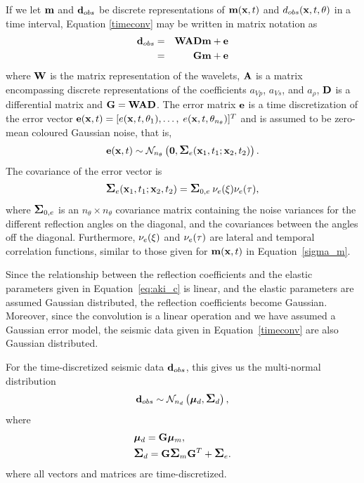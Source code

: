 If we let $\mathbf{m}$ and $\mathbf{d}_{obs}$ be discrete representations
of $\mathbf{m}(\mathbf{x},t)$ and $d_{obs}(\mathbf{x},t,\theta)$ in a time
interval, Equation \eqref{timeconv} may be written in matrix
notation as
%
\begin{eqnarray}
  \mathbf{d}_{obs} & = & \mathbf{W}\mathbf{A}\mathbf{D}\mathbf{m} + \mathbf{e} \label{eq:WADm}\\
                 & = & \mathbf{G}\mathbf{m} + \mathbf{e} \label{eq:Gm}
\end{eqnarray}
%
\noindent
where $\mathbf{W}$ is the matrix representation of the wavelets, $\mathbf{A}$ is
a matrix encompassing discrete representations of the coefficients $a_{Vp}$,
$a_{V\!s}$, and $a_\rho$, $\mathbf{D}$ is a differential matrix and
$\mathbf{G} = \mathbf{W}\mathbf{A}\mathbf{D}$. The
error matrix $\mathbf{e}$ is a time discretization of the error vector
$\mathbf{e}(\mathbf{x},t) = [e(\mathbf{x},t,\theta_1),\ldots,$
$e(\mathbf{x},t,\theta_{n_{\theta}})]^T$ and is assumed to be zero-mean
coloured Gaussian noise, that is,
%
\begin{equation}
  \mathbf{e}(\mathbf{x},t)
    \sim \mathcal{N}_{n_\theta}\left(\mathbf{0},
               \mbox{\large\ensuremath{\boldsymbol{\Sigma}}}_e(\mathbf{x}_1,t_1;\mathbf{x}_2,t_2)\right).
\label{edist}
\end{equation}
%
The covariance of the error vector is
%
\begin{equation}
  \mbox{\large\ensuremath{\boldsymbol{\Sigma}}}_e(\mathbf{x}_1,t_1;\mathbf{x}_2,t_2)
    = \mbox{\large\ensuremath{\boldsymbol{\Sigma}}}_{0,e} \: \nu_e(\xi) \nu_e(\tau), \label{sigma_e}
\end{equation}
%
where $\mbox{\large\ensuremath{\boldsymbol{\Sigma}}}_{0,e}$ is an $n_{\theta}\times n_{\theta}$
covariance matrix containing the noise variances for the different
reflection angles on the diagonal, and the covariances between the
angles off the diagonal. Furthermore, $\nu_e(\xi)$ and $\nu_e(\tau)$
are lateral and temporal correlation functions, similar to those
given for $\mathbf{m}(\mathbf{x},t)$ in Equation~\eqref{sigma_m}.

Since the relationship between the reflection coefficients and the
elastic parameters given in Equation~\eqref{eq:aki_c} is linear, and
the elastic parameters are assumed Gaussian distributed, the
reflection coefficients become Gaussian. Moreover, since the
convolution is a linear operation and we have assumed a Gaussian error
model, the seismic data given in Equation~\eqref{timeconv} are also
Gaussian distributed.

For the time-discretized seismic data $\mathbf{d}_{obs}$, this gives us
the multi-normal distribution
%
\begin{equation}
  \mathbf{d}_{obs} \sim
    \mathcal{N}_{n_d}\left(\bm\mu_d,\mbox{\large\ensuremath{\boldsymbol{\Sigma}}}_d\right),
\label{ddist}
\end{equation}
%
where
%
\begin{align}
  &\bm\mu_d = \mathbf{G}\bm\mu_{m},\\
  &\mbox{\large\ensuremath{\boldsymbol{\Sigma}}}_d = \mathbf{G}\mbox{\large\ensuremath{\boldsymbol{\Sigma}}}_{m}\mathbf{G}^T + \mbox{\large\ensuremath{\boldsymbol{\Sigma}}}_e.
\end{align}
%
where all vectors and matrices are time-discretized.

